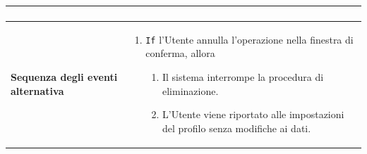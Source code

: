 \documentclass[a4paper]{report}
\begin{document}
\begin{table}[H]
\begin{tabular}{|p{3.9cm}|p{9.9cm}|}
\begin{enumerate}[leftmargin=14pt,label=\arabic*.,labelsep=0.5em,topsep=0pt,partopsep=0pt,parsep=0pt,itemsep=0pt]
\end{enumerate} \\ \hline
\textbf{Sequenza degli eventi alternativa} & \begin{enumerate}[leftmargin=14pt,label=\arabic*.,labelsep=0.5em,topsep=0pt,partopsep=0pt,parsep=0pt,itemsep=0pt]
   \item \texttt{If} l'Utente annulla l'operazione nella finestra di conferma, allora
   \begin{enumerate}[label=\arabic{enumi}.\arabic*.,leftmargin=22pt,labelsep=0.5em,topsep=0pt,partopsep=0pt,parsep=0pt,itemsep=0pt]
       \item Il sistema interrompe la procedura di eliminazione.
       \item L'Utente viene riportato alle impostazioni del profilo senza modifiche ai dati.
   \end{enumerate}
\end{enumerate}\\ \hline
\end{tabular}
\end{table}
\end{document}
